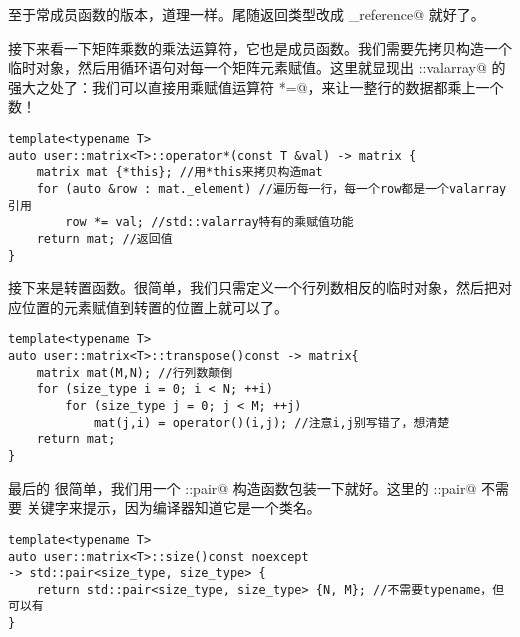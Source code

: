 至于常成员函数的版本，道理一样。尾随返回类型改成 \lstinline@const_reference@ 就好了。\par
接下来看一下矩阵乘数的乘法运算符，它也是成员函数。我们需要先拷贝构造一个临时对象，然后用循环语句对每一个矩阵元素赋值。这里就显现出 \lstinline@std::valarray@ 的强大之处了：我们可以直接用乘赋值运算符 \lstinline@*=@，来让一整行的数据都乘上一个数！
\begin{lstlisting}
template<typename T>
auto user::matrix<T>::operator*(const T &val) -> matrix {
    matrix mat {*this}; //用*this来拷贝构造mat
    for (auto &row : mat._element) //遍历每一行，每一个row都是一个valarray引用
        row *= val; //std::valarray特有的乘赋值功能
    return mat; //返回值
}
\end{lstlisting}\par
接下来是转置函数。很简单，我们只需定义一个行列数相反的临时对象，然后把对应位置的元素赋值到转置的位置上就可以了。
\begin{lstlisting}
template<typename T>
auto user::matrix<T>::transpose()const -> matrix{
    matrix mat(M,N); //行列数颠倒
    for (size_type i = 0; i < N; ++i)
        for (size_type j = 0; j < M; ++j)
            mat(j,i) = operator()(i,j); //注意i,j别写错了，想清楚
    return mat;
}
\end{lstlisting}\par
最后的 \lstinline@size@ 很简单，我们用一个 \lstinline@std::pair@ 构造函数包装一下就好。这里的 \lstinline@std::pair@ 不需要 \lstinline@typename@ 关键字来提示，因为编译器知道它是一个类名。
\begin{lstlisting}
template<typename T>
auto user::matrix<T>::size()const noexcept
-> std::pair<size_type, size_type> {
    return std::pair<size_type, size_type> {N, M}; //不需要typename，但可以有
}
\end{lstlisting}\par
